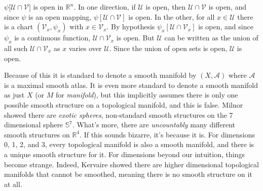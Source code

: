 \documentclass{article}
\theoremstyle{plain}
\theoremstyle{normal}
\begin{document}
        $\psi\big[\mathcal{U}\cap\mathcal{V}]$ is open in $\mathbb{R}^{n}$. In
        one direction, if $\mathcal{U}$ is open, then
        $\mathcal{U}\cap\mathcal{V}$ is open, and since $\psi$ is an open
        mapping, $\psi[\mathcal{U}\cap\mathcal{V}]$ is open. In the other,
        for all $x\in\mathcal{U}$ there is a chart
        $(\mathcal{V}_{x},\psi_{x})$ with $x\in\mathcal{V}_{x}$. By hypothesis
        $\psi_{x}[\mathcal{U}\cap\mathcal{V}_{x}]$ is open,
        and since $\psi_{x}$ is a continuous function,
        $\mathcal{U}\cap\mathcal{V}_{x}$ is open. But $\mathcal{U}$ can be
        written as the union of all such $\mathcal{U}\cap\mathcal{V}_{x}$ as
        $x$ varies over $\mathcal{U}$. Since the union of open sets is open,
        $\mathcal{U}$ is open.
        \par\hfill\par
        Because of this it is standard to denote a smooth manifold by
        $(X,\mathcal{A})$ where $\mathcal{A}$ is a maximal smooth atlas. It is
        even more standard to denote a smooth manifold as just $X$ (or $M$ for
        \textit{manifold}), but this implicitly assumes there is only one
        possible smooth structure on a topological manifold, and this is false.
        Milnor showed there are \textit{exotic spheres}, non-standard smooth
        structures on the 7 dimensional sphere $\mathbb{S}^{7}$. What's more,
        there are \textit{uncountably} many different smooth structures on
        $\mathbb{R}^{4}$. If this sounds bizarre, it's because it is. For
        dimensions 0, 1, 2, and 3, every topological manifold is also a
        smooth manifold, and there is a unique smooth structure for it.
        For dimensions beyond our intuition, things become strange. Indeed,
        Kervaire showed there are higher dimensional topological manifolds that
        cannot be smoothed, meaning there is no smooth structure on it at all.
\end{document}
